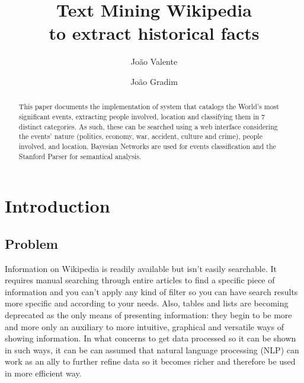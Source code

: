 \documentclass{llncs}
\begin{document}
\mainmatter              %
%
\title{Text Mining Wikipedia\\to extract historical facts}
%
%
\author{João Valente \and João Gradim}
%
%
%

\maketitle              %

\begin{abstract}
This paper documents the implementation of system that catalogs the World's most significant events, extracting people involved, location and classifying them in 7 distinct categories. As such, these can be searched using a web interface considering the events' nature (politics, economy, war, accident, culture and crime), people involved, and location. Bayesian Networks are used for events classification and the Stanford Parser for semantical analysis.
\end{abstract}

\section{Introduction}

\subsection{Problem}

Information on Wikipedia is readily available but isn't easily searchable. It requires manual searching through entire articles to find a specific piece of information and you can't apply any kind of filter so you can have search results more specific and according to your needs. Also, tables and lists are becoming deprecated as the only means of presenting information: they begin to be more and more only an auxiliary to more intuitive, graphical and versatile ways of showing information. In what concerns to get data processed so it can be shown in such ways, it can be can assumed that natural language processing (NLP) can work as an ally to further refine data so it becomes richer and therefore be used in more efficient way.\\
\end{document}
